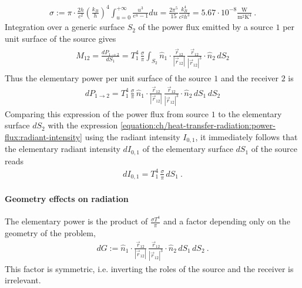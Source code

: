 \documentclass[letterpaper,10pt,english]{jupyterBook}
\begin{document}
\begin{equation*}
\begin{split}\sigma := \pi \cdot \frac{2 h}{c^2} \left( \frac{k_B}{h} \right)^4 \int_{u=0}^{+\infty} \frac{u^3}{e^{u}-1} du = \frac{2 \pi^5}{15}\frac{k_B^4}{c^2 h^3} = 5.67 \cdot 10^{-8} \frac{\text{W}}{\text{m}^2 \text{K}^4} \ .\end{split}
\end{equation*}
\sphinxAtStartPar
Integration over a generic surface \(S_2\) of the power flux emitted by a source \(1\) per unit surface of the source gives
\begin{equation*}
\begin{split}\begin{aligned}
  M_{12} = \frac{d P_{1 \rightarrow 2} }{d S_1} = T_1^4 \, \frac{\sigma}{\pi} \int_{S_2} \hat{n}_1 \cdot \frac{\vec{r}_{12}}{|\vec{r}_{12}|} \, \frac{\vec{r}_{12}}{|\vec{r}_{12}|^3} \cdot \hat{n}_2 \, dS_2
\end{aligned}\end{split}
\end{equation*}
\sphinxAtStartPar
Thus the elementary power per unit surface of the source \(1\) and the receiver \(2\) is
\begin{equation*}
\begin{split}dP_{1 \rightarrow 2} = T_1^4 \, \frac{\sigma}{\pi} \, \hat{n}_1 \cdot \frac{\vec{r}_{12}}{|\vec{r}_{12}|} \, \frac{\vec{r}_{12}}{|\vec{r}_{12}|^3} \cdot \hat{n}_2 \, dS_1 \, dS_2 \end{split}
\end{equation*}
\sphinxAtStartPar
Comparing this expression of the power flux from source \(1\) to the elementary surface \(d S_2\) with the expression \eqref{equation:ch/heat-transfer-radiation:power-flux:radiant-intensity} using the radiant intensity \(I_{0,1}\), it immediately follows that the elementary radiant intensity \(d I_{0,1}\) of the elementary surface \(d S_1\) of the source reads
\begin{equation*}
\begin{split}d I_{0,1} = T_1^4 \, \frac{\sigma}{\pi} \, d S_1 \ .\end{split}
\end{equation*}

\paragraph{Geometry effects on radiation}
\label{\detokenize{ch/heat-transfer-radiation:geometry-effects-on-radiation}}
\sphinxAtStartPar
The elementary power is the product of \(\frac{\sigma T^4}{\pi}\) and a factor depending only on the geometry of the problem,
\begin{equation*}
\begin{split}d G := \hat{n}_1 \cdot \frac{\vec{r}_{12}}{|\vec{r}_{12}|} \, \frac{\vec{r}_{12}}{|\vec{r}_{12}|^3} \cdot \hat{n}_2 \, dS_1 \, dS_2 \ .\end{split}
\end{equation*}
\sphinxAtStartPar
This factor is symmetric, i.e. inverting the roles of the source and the receiver is irrelevant.
\end{document}
